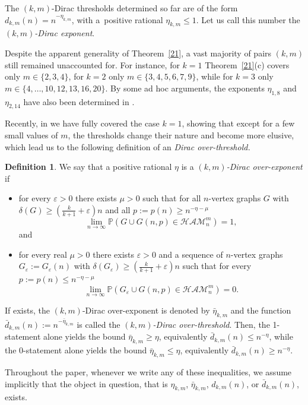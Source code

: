 \documentclass[reqno, 12pt]{amsart}
\numberwithin{equation}{section}
\numberwithin{figure}{section}
\let\epsilon=\varepsilon
\let\eps=\epsilon
\def\PP{{\mathds P}}
\let\Prob=\PP
\newcommand{\ham}{\mathcal{HAM}}
\theoremstyle{plain}
\theoremstyle{definition}
\newtheorem{dfn}[thm]{Definition}
\begin{document}
The $(k,m)$-Dirac thresholds determined so far are of the form $d_{k,m}(n)=n^{-\eta_{k,m}}$, with a~positive rational $\eta_{k,m}\le1$. Let us call this number the \emph{$(k,m)$-Dirac exponent}.

Despite the apparent generality of Theorem~\ref{21}, a vast majority of pairs $(k,m)$ still remained unaccounted for. For instance, for $k=1$ Theorem~\ref{21}(c) covers only $m\in\{2,3,4\}$, for $k=2$ only $m\in\{3,4,5,6,7,9\}$, while for $k=3$ only $m\in\{4,\dots,10,12,13,16,20\}$. By some ad hoc arguments, the exponents $\eta_{1,8}$ and $\eta_{2,14}$ have also been determined in \cite{ADRRS}.

Recently, in \cite{ADR} we have fully covered the case $k=1$, showing that except for a few small values of $m$, the thresholds change their nature and become more elusive, which lead us to the following definition of an \emph{Dirac over-threshold.}
	
\begin{dfn}\label{over} We say that a positive rational $\eta$ is a \emph{$(k,m)$-Dirac over-exponent} if
    \begin{itemize}
        \item[(i)] for every $\eps>0$ there exists $\mu>0$ such that for all $n$-vertex graphs $G$ with $\delta(G)\ge\left(\tfrac k{k+1}+\eps\right)n$ and all $p:=p(n)\ge n^{-\eta-\mu}$
        $$\lim_{n\to\infty}\Prob\left(G\cup G(n,p)\in\ham^m_n\right)=1,$$
        and
        \item[(ii)]  for every real $\mu>0$ there exists $\epsilon>0$ and a sequence of $n$-vertex graphs $G_\epsilon:=G_\epsilon(n)$ with $\delta(G_\eps)\ge\left(\tfrac k{k+1}+\epsilon\right)n$ such that for every $p:=p(n)\le n^{-\eta-\mu}$
	$$\lim_{n\to\infty}\Prob\left(G_\eps\cup    G(n,p)\in\ham^m_n\right)=0.$$
    \end{itemize}
If exists, the $(k,m)$-Dirac over-exponent is denoted by $\bar \eta_{k,m}$ and the function $\bar d_{k,m}(n) := n^{-\bar\eta_{k,m}}$ is called the \emph{$(k,m)$-Dirac over-threshold}. Then, the 1-statement alone yields the bound $\bar \eta_{k,m}\ge \eta$, equivalently $\bar d_{k,m}(n)\le n^{-\eta}$, while the 0-statement alone yields the bound $\bar \eta_{k,m}\le \eta$, equivalently $\bar d_{k,m}(n)\ge n^{-\eta}$.

Throughout the paper, whenever we write any of these inequalities, we assume implicitly that the object in question, that is $\eta_{k,m}$, $\bar \eta_{k,m}$, $d_{k,m}(n)$, or $\bar d_{k,m}(n)$, exists.
\end{dfn}
\end{document}
